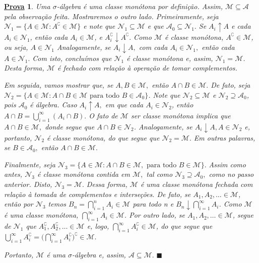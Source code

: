 \documentclass{article}
\newtheorem*{proof*}{\underline{Prova}}
\renewcommand\qedsymbol{$\blacksquare$}
\begin{document}
\begin{proof*}
	Uma \(\sigma \)-álgebra é uma classe monótona por definição. Assim, \(\mathcal{M}\subseteq \mathcal{A}\) pela observação feita. Mostraremos o outro lado. Primeiramente,
	seja \(\mathcal{N}_{1} = \{A\in \mathcal{M}: A ^{\complement}\in \mathcal{M}\}\) e note que \(\mathcal{N}_{1} \subseteq \mathcal{M}\) e que \(\mathcal{A}_{0} \subseteq \mathcal{N}_1.\) Se \(A_{i}\uparrow A\) e cada \(A_{i}\in \mathcal{N}_1\),
	então cada \(A_{i}\in \mathcal{M}\), e \(A_{i}^{\complement}\downarrow A ^{\complement}.\) Como \(\mathcal{M}\) é classe monótona, \(A ^{\complement}\in \mathcal{M}\), ou seja, \(A\in \mathcal{N}_{1}\)
	Analogamente, se \(A_{i}\downarrow A,\) com cada \(A_{i}\in \mathcal{N}_1,\) então cada \(A\in \mathcal{N}_1.\) Com isto, concluímos que \(\mathcal{N}_{1}\) é classe monótona e, assim,
	\(\mathcal{N}_1 = \mathcal{M}\). Desta forma, \(\mathcal{M}\) é fechado com relação à operação de tomar complementos.

	Em seguida, vamos mostrar que, se \(A, B\in \mathcal{M},\) então \(A\cap B\in \mathcal{M}.\) De fato, seja \(\mathcal{N}_{2} = \{A\in \mathcal{M}:A\cap B\in \mathcal{M} \text{ para todo }B\in \mathcal{A}_{0}\}\).
	Note que \(\mathcal{N}_2\subseteq \mathcal{M}\) e \(\mathcal{N}_2\supseteq \mathcal{A}_{0}\), pois \(\mathcal{A}_{0}\) é álgebra. Caso \(A_{i}\uparrow A,\) em que cada \(A_{i}\in \mathcal{N}_2\), então \(A\cap B = \bigcup_{i=1}^{\infty}(A_{i}\cap B).\)
	O fato de \(\mathcal{M}\) ser classe monótona implica que \(A\cap B\in \mathcal{M},\) donde segue que \(A\cap B\in \mathcal{N}_2\). Analogamente, se \(A_{i}\downarrow A, A\in \mathcal{N}_2\) e, portanto, \(\mathcal{N}_2\) é classe monótona, do que segue que \(\mathcal{N}_2 = \mathcal{M}.\)
	Em outras palavras, se \(B\in \mathcal{A}_{0}, \) então \(A\cap B\in \mathcal{M}.\)

	Finalmente, seja \(\mathcal{N}_{3} = \{A\in \mathcal{M}: A\cap B\in \mathcal{M},\text{ para todo }B\in \mathcal{M}\}.\) Assim como antes, \(\mathcal{N}_3\)
	é classe monótona contida em \(\mathcal{M},\) tal como \(\mathcal{N}_{3}\supseteq \mathcal{A}_{0},\) como no passo anterior. Disto, \(\mathcal{N}_3 = \mathcal{M}.\)
	Dessa forma, \(\mathcal{M}\) é uma classe monótona fechada com relação à tomada de complementos e interseções. De fato, se \(A_1, A_2, \dotsc \in \mathcal{M}\), então por \(\mathcal{N}_3\) temos
	\(B_{n} = \bigcap_{i=1}^{n}A_{i}\in \mathcal{M}\) para todo n e \(B_{n}\downarrow \bigcap_{i=1}^{\infty}A_{i}\).  Como \(\mathcal{M}\) é uma classe monótona, \(\bigcap_{i=1}^{\infty}A_{i}\in \mathcal{M}\).
	Por outro lado, se \(A_1, A_2, \dotsc \in \mathcal{M}\), segue de \(\mathcal{N}_1\) que \(A_{1}^{\complement}, A_{2}^{\complement}, \dotsc \in \mathcal{M}\) e, logo, \(\bigcap_{i=1}^{\infty}A_{i}^{\complement}\in \mathcal{M}\), do que segue que
	\(\bigcup_{i=1}^{\infty}A_{i}^{\complement}=\biggl(\bigcap_{i=1}^{\infty}A_{i}^{\complement}\biggr)^{\complement}\in \mathcal{M}.\)

	Portanto, \(\mathcal{M}\) é uma \(\sigma \)-álgebra e, assim, \(\mathcal{A} \subseteq \mathcal{M}.\) \qedsymbol
\end{proof*}
\end{document}
